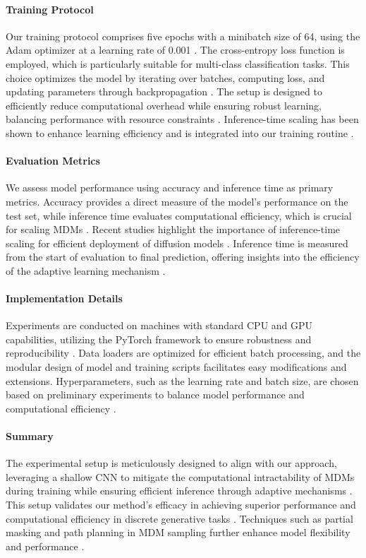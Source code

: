 \documentclass[11pt]{article}
\begin{document}
\paragraph{Training Protocol} 
Our training protocol comprises five epochs with a minibatch size of 64, using the Adam optimizer at a learning rate of 0.001 \cite{diffusion2025}. The cross-entropy loss function is employed, which is particularly suitable for multi-class classification tasks. This choice optimizes the model by iterating over batches, computing loss, and updating parameters through backpropagation \cite{highfield2019}. The setup is designed to efficiently reduce computational overhead while ensuring robust learning, balancing performance with resource constraints \cite{a2023,steering2024,mdta2g2024}. Inference-time scaling has been shown to enhance learning efficiency and is integrated into our training routine \cite{improving2025}.

\paragraph{Evaluation Metrics} 
We assess model performance using accuracy and inference time as primary metrics. Accuracy provides a direct measure of the model's performance on the test set, while inference time evaluates computational efficiency, which is crucial for scaling MDMs \cite{masked2024,scaling2024,path2025}. Recent studies highlight the importance of inference-time scaling for efficient deployment of diffusion models \cite{improving2025}. Inference time is measured from the start of evaluation to final prediction, offering insights into the efficiency of the adaptive learning mechanism \cite{spg2025,beyond2025}.

\paragraph{Implementation Details} 
Experiments are conducted on machines with standard CPU and GPU capabilities, utilizing the PyTorch framework to ensure robustness and reproducibility \cite{dice2024}. Data loaders are optimized for efficient batch processing, and the modular design of model and training scripts facilitates easy modifications and extensions. Hyperparameters, such as the learning rate and batch size, are chosen based on preliminary experiments to balance model performance and computational efficiency \cite{nomad2023,genmol2025,llcaps2023}.

\paragraph{Summary} 
The experimental setup is meticulously designed to align with our approach, leveraging a shallow CNN to mitigate the computational intractability of MDMs during training while ensuring efficient inference through adaptive mechanisms \cite{diffusion2021}. This setup validates our method's efficacy in achieving superior performance and computational efficiency in discrete generative tasks \cite{masked2024,improving2025,hyperdiffusionfields2025,all2022}. Techniques such as partial masking and path planning in MDM sampling further enhance model flexibility and performance \cite{path2025,interactionbased2023}.
\end{document}
